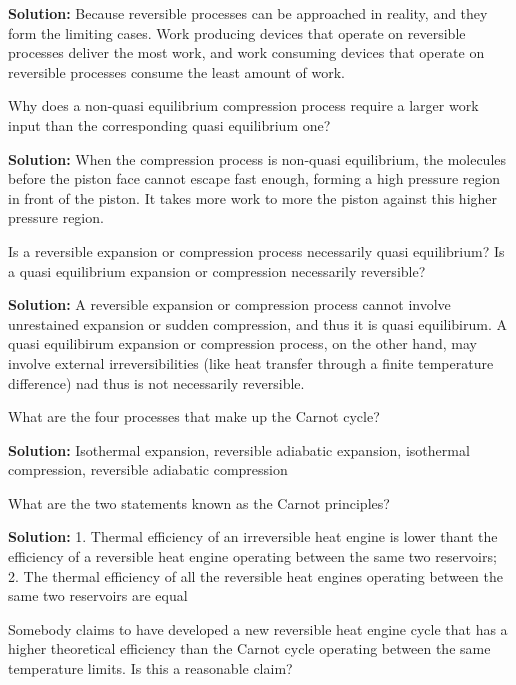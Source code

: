 \begin{list}{\bf Question :~}{}
       {\bf Solution:} Because reversible processes can be approached in reality, and they form the limiting cases. Work producing devices that operate on reversible processes deliver the most work, and work consuming devices that operate on reversible processes consume the least amount of work.

%
     \item\label{Q14} Why does a non-quasi equilibrium compression process require a larger work input than the corresponding quasi equilibrium one?
%

       {\bf Solution:}  When the compression process is non-quasi equilibrium, the molecules before the piston face cannot escape fast enough, forming a high pressure region in front of the piston. It takes more work to more the piston against this higher pressure region.
%
     \item\label{Q15} Is a reversible expansion or compression process necessarily quasi equilibrium? Is a quasi equilibrium expansion or compression necessarily reversible?
%

       {\bf Solution:}  A reversible expansion or compression process cannot involve unrestained expansion or sudden compression, and thus it is quasi equilibirum. A quasi equilibirum expansion or compression process, on the other hand, may involve external irreversibilities (like heat transfer through a finite temperature difference) nad thus is not necessarily reversible.

%
     \item\label{Q16} What are the four processes that make up the Carnot cycle?
%

       {\bf Solution:}  Isothermal expansion, reversible adiabatic expansion, isothermal compression, reversible adiabatic compression

%
     \item\label{Q17} What are the two statements known as the Carnot principles? 
%

       {\bf Solution:} 1. Thermal efficiency of an irreversible heat engine is lower thant the efficiency of a reversible heat engine operating between the same two reservoirs; 2. The thermal efficiency of all the reversible heat engines operating between the same two reservoirs are equal

%
     \item\label{Q18} Somebody claims to have developed a new reversible heat engine cycle that has a higher theoretical efficiency than the Carnot cycle operating between the same temperature limits. Is this a reasonable claim? 
%


\end{list}
